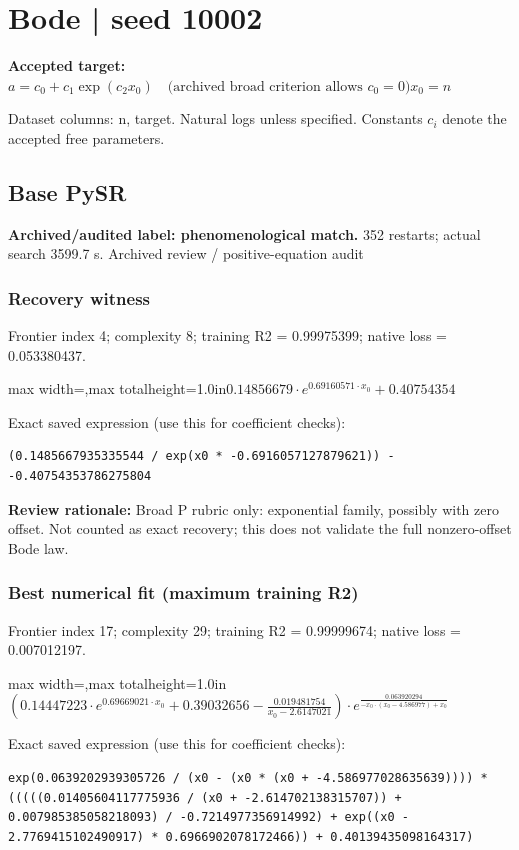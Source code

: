 \documentclass[10pt,letterpaper,landscape]{article}
\begin{document}
\section*{Bode | seed 10002}
\textbf{Accepted target:} $\displaystyle a=c_0+c_1\exp(c_2x_0)\quad\text{(archived broad criterion allows }c_0=0\text{)}$\hfill $x_0=n$\par
{\small Dataset columns: n, target. Natural logs unless specified. Constants $c_i$ denote the accepted free parameters.}\par\medskip
\begin{minipage}[t]{0.485\textwidth}
\subsection*{Base PySR}
\textbf{Archived/audited label: phenomenological match.} 352 restarts; actual search 3599.7 s.
{\small Archived review / positive-equation audit}
\subsubsection*{Recovery witness}
Frontier index 4; complexity 8; training R2 = 0.99975399; native loss = 0.053380437.
\begin{center}\begin{adjustbox}{max width=\linewidth,max totalheight=1.0in}$\displaystyle 0.14856679 \cdot e^{0.69160571 \cdot x_{0}} + 0.40754354$\end{adjustbox}\end{center}
{\scriptsize Exact saved expression (use this for coefficient checks):}
\begin{lstlisting}
(0.1485667935335544 / exp(x0 * -0.6916057127879621)) - -0.40754353786275804
\end{lstlisting}
{\small\textbf{Review rationale:} Broad P rubric only: exponential family, possibly with zero offset. Not counted as exact recovery; this does not validate the full nonzero-offset Bode law.}
\subsubsection*{Best numerical fit (maximum training R2)}
Frontier index 17; complexity 29; training R2 = 0.99999674; native loss = 0.007012197.
\begin{center}\begin{adjustbox}{max width=\linewidth,max totalheight=1.0in}$\displaystyle \left(0.14447223 \cdot e^{0.69669021 \cdot x_{0}} + 0.39032656 - \frac{0.019481754}{x_{0} - 2.6147021}\right) \cdot e^{\frac{0.063920294}{- x_{0} \cdot \left(x_{0} - 4.586977\right) + x_{0}}}$\end{adjustbox}\end{center}
{\scriptsize Exact saved expression (use this for coefficient checks):}
\begin{lstlisting}
exp(0.0639202939305726 / (x0 - (x0 * (x0 + -4.586977028635639)))) * (((((0.01405604117775936 / (x0 + -2.614702138315707)) + 0.007985385058218093) / -0.7214977356914992) + exp((x0 - 2.7769415102490917) * 0.6966902078172466)) + 0.40139435098164317)
\end{lstlisting}
\end{minipage}\hfill
\end{document}
